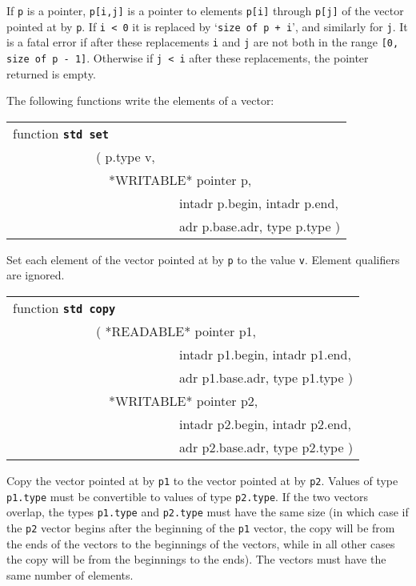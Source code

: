 \documentclass[12pt]{article}
\makeatletter
\newcommand{\TT}[1]{{\tt \bfseries #1}}
\newcommand{\ttstdmkey}[2]{\TT{std #1}\index{#1@{\tt std #1}!#2}}
\newenvironment{indpar}[1][0.3in]%
	{\begin{list}{}%
		     {\setlength{\itemsep}{0in}%
		      \setlength{\topsep}{0in}%
		      \setlength{\parsep}{1ex}%
		      \setlength{\labelwidth}{#1}%
		      \setlength{\leftmargin}{#1}%
		      \addtolength{\leftmargin}{\labelsep}}%
	 \item}%
	{\end{list}}
\makeatother
\begin{document}
\begin{indpar}
\begin{indpar}
If {\tt p} is a pointer, {\tt p[i,j]} is a pointer to elements
{\tt p[i]} through {\tt p[j]} of the vector pointed at by {\tt p}.
If {\tt i < 0} it is replaced by `{\tt size of p + i}', and similarly
for {\tt j}.
It is a fatal error if after these replacements {\tt i} and {\tt j}
are not both in the range {\tt [0, size of p - 1]}.
Otherwise if {\tt j < i} after these replacements,
the pointer returned is empty.
\end{indpar}


\end{indpar}

The following functions write the elements of a vector:

\begin{indpar}

{\tt\begin{tabular}{@{}l}
function \ttstdmkey{set}{vectors} \\
~~~~~~~~~~~~~( p.type v, \\
~~~~~~~~~~~~~~~*WRITABLE* pointer p, \\
~~~~~~~~~~~~~~~~~~~~~~~~~~intadr p.begin, intadr p.end, \\
~~~~~~~~~~~~~~~~~~~~~~~~~~adr p.base.adr, type p.type ) \\
\end{tabular}}

\begin{indpar}
Set each element of the vector pointed at by {\tt p} to the value {\tt v}.
Element qualifiers are ignored.
\end{indpar}

{\tt\begin{tabular}{@{}l}
function \ttstdmkey{copy}{vectors} \\
~~~~~~~~~~~~~( *READABLE* pointer p1, \\
~~~~~~~~~~~~~~~~~~~~~~~~~~intadr p1.begin, intadr p1.end, \\
~~~~~~~~~~~~~~~~~~~~~~~~~~adr p1.base.adr, type p1.type ) \\
~~~~~~~~~~~~~~~*WRITABLE* pointer p2, \\
~~~~~~~~~~~~~~~~~~~~~~~~~~intadr p2.begin, intadr p2.end, \\
~~~~~~~~~~~~~~~~~~~~~~~~~~adr p2.base.adr, type p2.type ) \\
\end{tabular}}

\begin{indpar}
Copy the vector pointed at by {\tt p1} to the vector pointed at by
{\tt p2}.  Values of type {\tt p1.type} must be convertible to
values of type {\tt p2.type}.  If the two vectors overlap,
the types {\tt p1.type} and {\tt p2.type} must have the same
size (in which case if the {\tt p2} vector begins after
the beginning of the {\tt p1} vector, the copy will be from the ends of
the vectors to the beginnings of the vectors, while in all other
cases the copy will be from the beginnings to the ends).
The vectors must have the same number of elements.
\end{indpar}

\end{indpar}
\end{document}
